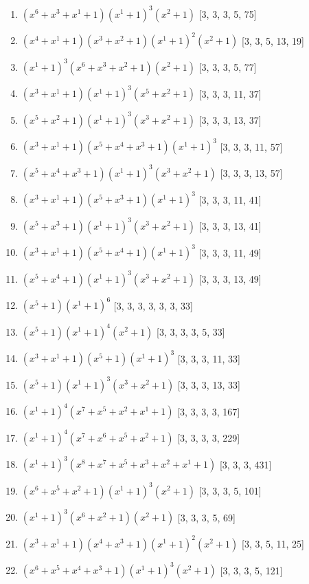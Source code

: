 \documentclass[10pt,twocolumn]{article}
\begin{document}
\begin{enumerate}
\item $(x^{6} + x^{3} + x^{1} + 1)(x^{1} + 1)^{3}(x^{2} + 1)$  [3, 3, 3, 5, 75]
\item $(x^{4} + x^{1} + 1)(x^{3} + x^{2} + 1)(x^{1} + 1)^{2}(x^{2} + 1)$  [3, 3, 5, 13, 19]
\item $(x^{1} + 1)^{3}(x^{6} + x^{3} + x^{2} + 1)(x^{2} + 1)$  [3, 3, 3, 5, 77]
\item $(x^{3} + x^{1} + 1)(x^{1} + 1)^{3}(x^{5} + x^{2} + 1)$  [3, 3, 3, 11, 37]
\item $(x^{5} + x^{2} + 1)(x^{1} + 1)^{3}(x^{3} + x^{2} + 1)$  [3, 3, 3, 13, 37]
\item $(x^{3} + x^{1} + 1)(x^{5} + x^{4} + x^{3} + 1)(x^{1} + 1)^{3}$  [3, 3, 3, 11, 57]
\item $(x^{5} + x^{4} + x^{3} + 1)(x^{1} + 1)^{3}(x^{3} + x^{2} + 1)$  [3, 3, 3, 13, 57]
\item $(x^{3} + x^{1} + 1)(x^{5} + x^{3} + 1)(x^{1} + 1)^{3}$  [3, 3, 3, 11, 41]
\item $(x^{5} + x^{3} + 1)(x^{1} + 1)^{3}(x^{3} + x^{2} + 1)$  [3, 3, 3, 13, 41]
\item $(x^{3} + x^{1} + 1)(x^{5} + x^{4} + 1)(x^{1} + 1)^{3}$  [3, 3, 3, 11, 49]
\item $(x^{5} + x^{4} + 1)(x^{1} + 1)^{3}(x^{3} + x^{2} + 1)$  [3, 3, 3, 13, 49]
\item $(x^{5} + 1)(x^{1} + 1)^{6}$  [3, 3, 3, 3, 3, 3, 33]
\item $(x^{5} + 1)(x^{1} + 1)^{4}(x^{2} + 1)$  [3, 3, 3, 3, 5, 33]
\item $(x^{3} + x^{1} + 1)(x^{5} + 1)(x^{1} + 1)^{3}$  [3, 3, 3, 11, 33]
\item $(x^{5} + 1)(x^{1} + 1)^{3}(x^{3} + x^{2} + 1)$  [3, 3, 3, 13, 33]
\item $(x^{1} + 1)^{4}(x^{7} + x^{5} + x^{2} + x^{1} + 1)$  [3, 3, 3, 3, 167]
\item $(x^{1} + 1)^{4}(x^{7} + x^{6} + x^{5} + x^{2} + 1)$  [3, 3, 3, 3, 229]
\item $(x^{1} + 1)^{3}(x^{8} + x^{7} + x^{5} + x^{3} + x^{2} + x^{1} + 1)$  [3, 3, 3, 431]
\item $(x^{6} + x^{5} + x^{2} + 1)(x^{1} + 1)^{3}(x^{2} + 1)$  [3, 3, 3, 5, 101]
\item $(x^{1} + 1)^{3}(x^{6} + x^{2} + 1)(x^{2} + 1)$  [3, 3, 3, 5, 69]
\item $(x^{3} + x^{1} + 1)(x^{4} + x^{3} + 1)(x^{1} + 1)^{2}(x^{2} + 1)$  [3, 3, 5, 11, 25]
\item $(x^{6} + x^{5} + x^{4} + x^{3} + 1)(x^{1} + 1)^{3}(x^{2} + 1)$  [3, 3, 3, 5, 121]

\end{enumerate}
\end{document}
